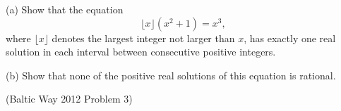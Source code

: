 (a) Show that the equation
\[\lfloor x \rfloor (x^2 + 1) = x^3,\]
where $\lfloor x \rfloor$ denotes the largest integer not larger than $x$, has exactly one real solution in each interval between consecutive positive integers.

(b) Show that none of the positive real solutions of this equation is rational.

(Baltic Way 2012 Problem 3)